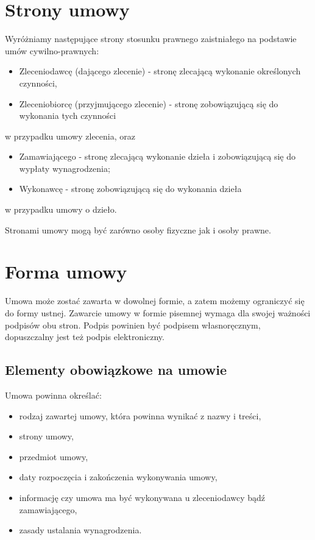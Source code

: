 \section[Strony umowy][Strony umowy]{Strony umowy}
Wyróżniamy następujące strony stosunku prawnego zaistniałego na podstawie umów cywilno-prawnych:
\begin{itemize}
	\item Zleceniodawcę (dającego zlecenie) - stronę zlecającą wykonanie określonych czynności,
	\item Zleceniobiorcę (przyjmującego zlecenie) - stronę zobowiązującą się do wykonania tych czynności
\end{itemize}
w przypadku umowy zlecenia, oraz
\begin{itemize}
	\item Zamawiającego - stronę zlecającą wykonanie dzieła i zobowiązującą się do wypłaty wynagrodzenia;
	\item Wykonawcę - stronę zobowiązującą się do wykonania dzieła
\end{itemize}
w przypadku umowy o dzieło.

Stronami umowy mogą być zarówno osoby fizyczne jak i osoby prawne.

\section[Forma umowy][Forma umowy]{Forma umowy}
Umowa może zostać zawarta w dowolnej formie, a zatem możemy ograniczyć się do formy ustnej. Zawarcie umowy w formie pisemnej wymaga dla swojej ważności podpisów obu stron. Podpis powinien być podpisem własnoręcznym, dopuszczalny jest też podpis elektroniczny.

\subsection[Elementy obowiązkowe na umowie][Elementy obowiązkowe na umowie]{Elementy obowiązkowe na umowie}
Umowa powinna określać:
\begin{itemize}
\item rodzaj zawartej umowy, która powinna wynikać z nazwy i treści,
\item strony umowy,
\item przedmiot umowy,
\item daty rozpoczęcia i zakończenia wykonywania umowy,
\item informację czy umowa ma być wykonywana u zleceniodawcy bądź zamawiającego,
\item zasady ustalania wynagrodzenia.
\end{itemize}

